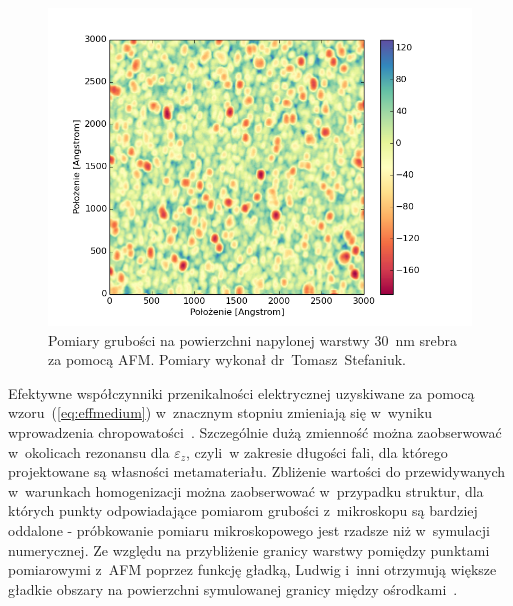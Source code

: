 \begin{figure}[bt]
		\includegraphics[width=\textwidth]{images/multilayer/ag30nm-afm-measure.png}
		\caption{Pomiary grubości na powierzchni napylonej warstwy $30$~nm srebra za pomocą AFM. Pomiary wykonał dr~Tomasz~Stefaniuk.} 
		\label{fig:ag30nm-afmmeasure}
\end{figure}


Efektywne współczynniki przenikalności elektrycznej uzyskiwane za pomocą wzoru~(\ref{eq:effmedium}) w~znacznym stopniu zmieniają się w~wyniku wprowadzenia chropowatości~\cite{ludwig2012impact}. Szczególnie dużą zmienność można zaobserwować w~okolicach rezonansu dla $\varepsilon_{z}$, czyli~w zakresie długości fali, dla którego projektowane są własności metamateriału. Zbliżenie wartości do przewidywanych w~warunkach homogenizacji można zaobserwować w~przypadku struktur, dla których punkty odpowiadające pomiarom grubości z~mikroskopu są bardziej oddalone - próbkowanie pomiaru mikroskopowego jest rzadsze niż w~symulacji numerycznej. Ze względu na przybliżenie granicy warstwy pomiędzy punktami pomiarowymi z~AFM poprzez funkcję gładką, Ludwig i~inni otrzymują większe gładkie obszary na powierzchni symulowanej granicy między ośrodkami~\cite{ludwig2012impact}. 

